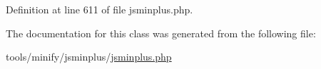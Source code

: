 Definition at line 611 of file jsminplus.\+php.



The documentation for this class was generated from the following file\+:\begin{DoxyCompactItemize}
\item 
tools/minify/jsminplus/\hyperlink{jsminplus_8php}{jsminplus.\+php}\end{DoxyCompactItemize}
